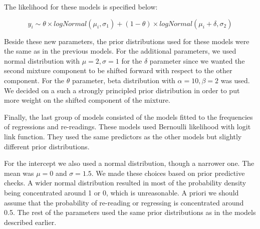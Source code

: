 The likelihood for these models is specified below:

\[ y_{i} \sim \theta \times logNormal(\mu_{i}, \sigma_{1}) + (1 - \theta) \times logNormal(\mu_{i} + \delta, \sigma_{2}) \]

Beside these new parameters, the prior distributions used for these
models were the same as in the previous models. For the additional
parameters, we used normal distribution with \(\mu = 2, \sigma = 1\) for
the \(\delta\) parameter since we wanted the second mixture component to
be shifted forward with respect to the other component. For the
\(\theta\) parameter, beta distribution with \(\alpha = 10, \beta = 2\)
was used. We decided on a such a strongly principled prior distribution
in order to put more weight on the shifted component of the mixture.

Finally, the last group of models consisted of the models fitted to the
frequencies of regressions and re-readings. These models used Bernoulli
likelihood with logit link function. They used the same predictors as
the other models but slightly different prior distributions.

For the intercept we also used a normal distribution, though a narrower
one. The mean was \(\mu = 0\) and \(\sigma = 1.5\). We made these
choices based on prior predictive checks. A wider normal distribution
resulted in most of the probability density being concentrated around 1
or 0, which is unreasonable. A priori we should assume that the
probability of re-reading or regressing is concentrated around 0.5. The
rest of the parameters used the same prior distributions as in the
models described earlier.
